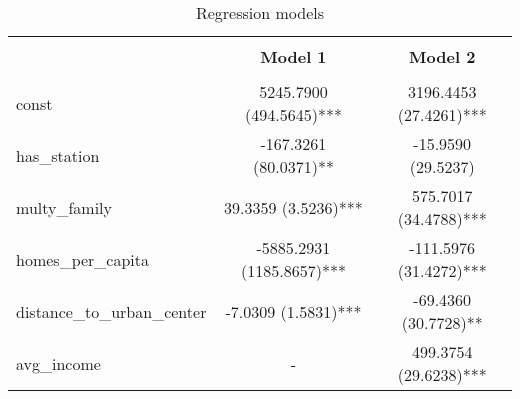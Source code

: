 
    \begin{table}
        \centering
        \caption{Regression models}
        \vspace{10pt}
        \label{tab:regression_models}
        \begin{tabular}{lcc}
        \hline
        \hline \\[-1.8ex]
     & \textbf{Model 1} & \textbf{Model 2} \\
\hline \\[-1.8ex] 
const & 5245.7900 (494.5645)*** & 3196.4453 (27.4261)*** \\
has\_station & -167.3261 (80.0371)** & -15.9590 (29.5237) \\
multy\_family & 39.3359 (3.5236)*** & 575.7017 (34.4788)*** \\
homes\_per\_capita & -5885.2931 (1185.8657)*** & -111.5976 (31.4272)*** \\
distance\_to\_urban\_center & -7.0309 (1.5831)*** & -69.4360 (30.7728)** \\
avg\_income & - & 499.3754 (29.6238)*** \\

        \hline
        \hline
        \end{tabular}
    \end{table}
    